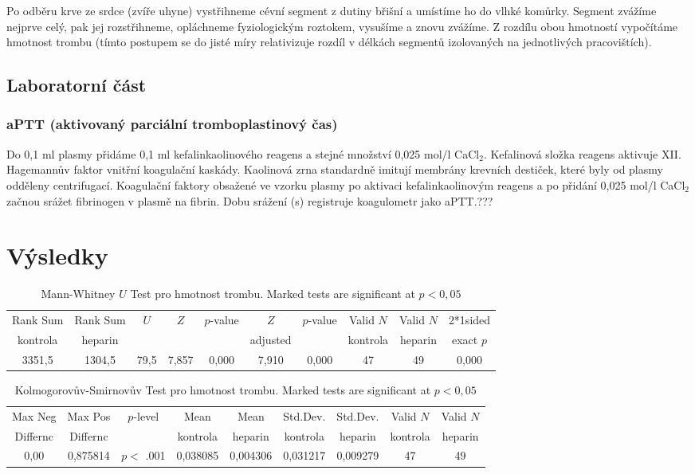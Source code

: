 \documentclass[12pt]{article}
\begin{document}
Po odběru krve ze srdce (zvíře uhyne) vystřihneme cévní segment z dutiny břišní a umístíme ho
do vlhké komůrky. Segment zvážíme nejprve celý, pak jej rozstřihneme, opláchneme
fyziologickým roztokem, vysušíme a znovu zvážíme. Z rozdílu obou hmotností vypočítáme
hmotnost trombu (tímto postupem se do jisté míry relativizuje rozdíl v délkách segmentů
izolovaných na jednotlivých pracovištích).

\subsection{Laboratorní část}
\subsubsection{aPTT (aktivovaný parciální tromboplastinový čas)}
Do 0,1 ml plasmy přidáme 0,1 ml kefalinkaolinového reagens a stejné množství 0,025 mol/l
CaCl$_2$. Kefalinová složka reagens aktivuje XII. Hagemannův faktor vnitřní koagulační kaskády.
Kaolinová zrna standardně imitují membrány krevních destiček, které byly od plasmy odděleny
centrifugací. Koagulační faktory obsažené ve vzorku plasmy po aktivaci kefalinkaolinovým
reagens a po přidání 0,025 mol/l CaCl$_2$ začnou srážet fibrinogen v plasmě na fibrin. Dobu srážení
(s) registruje koagulometr jako aPTT.???

\section{Výsledky}

\begin{table}[h!]
\begin{tabular}{|c|c|c|c|c|c|c|c|c|c|}
\hline
Rank Sum & Rank Sum & $U$ & $Z$ & $p$-value & $Z$ & $p$-value & Valid $N$ & Valid $N$ & 2*1sided \\
kontrola & heparin & & & & adjusted & & kontrola & heparin & exact $p$ \\
\hline
3351,5 & 1304,5 & 79,5 & 7,857 & 0,000 & 7,910 & 0,000 & 47 & 49 & 0,000 \\
\hline
\end{tabular}
\caption{Mann-Whitney $U$ Test pro hmotnost trombu. Marked tests are significant at $p < 0,05$}
\end{table}

\begin{table}[h!]
\begin{tabular}{|c|c|c|c|c|c|c|c|c|}
\hline
Max Neg & Max Pos & $p$-level & Mean & Mean & Std.Dev. & Std.Dev. & Valid $N$ & Valid $N$ \\
Differnc & Differnc & & kontrola & heparin & kontrola & heparin & kontrola & heparin \\
\hline
0,00 & 0,875814 & $p <$ .001 & 0,038085 & 0,004306 & 0,031217 & 0,009279 & 47 & 49 \\
\hline
\end{tabular}
\caption{Kolmogorovův-Smirnovův Test pro hmotnost trombu. Marked tests are significant at $p < 0,05$}
\end{table}
\end{document}
